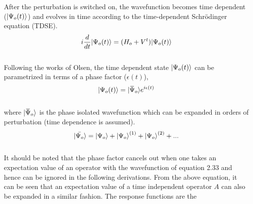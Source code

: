 After the perturbation is switched on, the wavefunction becomes time dependent 
($| \Psi_o(t) \rangle$) and evolves in time according to the time-dependent
Schr\"odinger equation (TDSE).
\\
\begin{equation}
i\frac{d}{dt}| \Psi_o(t) \rangle = (H_o + V^t)| \Psi_o(t) \rangle
\end{equation}
\\
Following the works of Olsen\cite{Olsen85}, the time dependent state $| \Psi_o(t) \rangle$
can be parametrized in terms of a phase factor ($\epsilon(t)$),
\\
\begin{equation}
\ket{\Psi_o(t)} = \ket{{\overbar{\Psi}_o}}e^{i\epsilon(t)}
\end{equation}
\\
where $\ket{{\overbar{\Psi}_o}}$ is the phase isolated wavefunction which can be expanded 
in orders of perturbation (time dependence is assumed).\\
\begin{equation}
| \bar{\Psi_o} \rangle = | \Psi_o \rangle + {| \Psi_o \rangle}^{(1)}+ {| \Psi_o \rangle}^{(2)} + ...
\end{equation}
\\
It should be noted that the phase factor cancels out when one takes an expectation
value of an operator with the wavefunction of equation 2.33 and hence can be 
ignored in the following derivations.
From the above equation, it can be seen that an expectation value of a time independent
operator $A$ can also be expanded in a similar fashion. The response functions are the 
